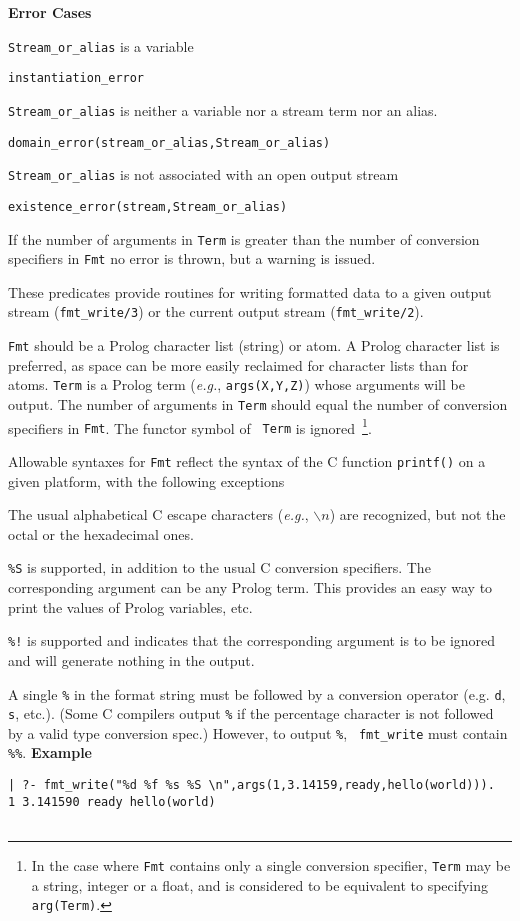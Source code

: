 \begin{description}
{\bf Error Cases}
\bi
\item 	{\tt Stream\_or\_alias} is a variable
\bi
\item {\tt instantiation\_error}
\ei
\item 	{\tt Stream\_or\_alias} is neither a variable nor a stream term nor an alias.
\bi
\item 	{\tt domain\_error(stream\_or\_alias,Stream\_or\_alias)}
\ei
\item 	{\tt Stream\_or\_alias} is not associated with an open output stream
\bi
\item 	{\tt existence\_error(stream,Stream\_or\_alias)}
\ei
\ei

If the number of arguments in {\tt Term} is greater than the number of
conversion specifiers in {\tt Fmt} no error is thrown, but a warning
is issued.

\vspace{-7mm}
%
These predicates provide routines for writing formatted data to a
given output stream ({\tt fmt\_write/3}) or the current output stream
({\tt fmt\_write/2}).

{\tt Fmt} should be a Prolog character list (string) or atom.  A
Prolog character list is preferred, as space can be more easily
reclaimed for character lists than for atoms.  {\tt Term} is a Prolog
term ({\it e.g.}, {\tt args(X,Y,Z)}) whose arguments will be
output. The number of arguments in {\tt Term} should equal the number
of conversion specifiers in {\tt Fmt}.  The functor symbol of {\tt
  Term} is ignored~\footnote{In the case where {\tt Fmt} contains only
  a single conversion specifier, {\tt Term} may be a string, integer
  or a float, and is considered to be equivalent to specifying {\tt
    arg(Term)}.}.
    
Allowable syntaxes for {\tt Fmt} reflect the syntax of the C function
{\tt printf()} on a given platform, with the following exceptions
%
\bi
\item The usual alphabetical C escape characters ({\it e.g.},
  $\backslash n$) are recognized, but not the octal or the hexadecimal
  ones.
\item {\tt \%S} is supported, in addition to the usual C conversion
  specifiers.  The corresponding argument can be any Prolog term. This
  provides an easy way to print the values of Prolog variables, etc.
\item {\tt \%!} is supported and indicates that the corresponding
  argument is to be ignored and will generate nothing in the output.
\item A single {\tt \%} in the format string must be followed by a
  conversion operator (e.g. {\tt d}, {\tt s}, etc.). (Some C compilers
  output {\tt \%} if the percentage character is not followed by a
  valid type conversion spec.)  However, to output {\tt \%}, {\tt
    fmt\_write} must contain {\tt \%\%}.
\ei    
%
{\bf Example}
{\small
\begin{verbatim}
| ?- fmt_write("%d %f %s %S \n",args(1,3.14159,ready,hello(world))).
1 3.141590 ready hello(world)


\end{verbatim}}
\end{description}
